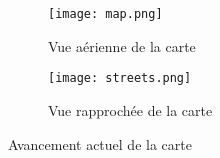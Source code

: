 \documentclass[../doc.tex]{subfiles}
\begin{document}
    


    \begin{figure}[hbt!]
        
        \begin{subfigure}[b]{1\textwidth}
            \center
            \texttt{[image: map.png]} 
            \caption{Vue aérienne de la carte}
        \end{subfigure}
        \vfill{}
        \begin{subfigure}[b]{1\textwidth}
            \center
            \texttt{[image: streets.png]} 
            \caption{Vue rapprochée de la carte}
        \end{subfigure}
        \caption{Avancement actuel de la carte}
    \end{figure}
        

    
    
\end{document}
